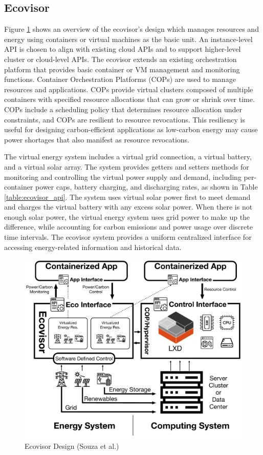 \subsection{Ecovisor}

Figure \ref{fig:ecovisor_design} shows an overview of the ecovisor's design
which manages resources and energy using containers or virtual machines as the
basic unit. An instance-level API is chosen to align with existing cloud APIs
and to support higher-level cluster or cloud-level APIs. The ecovisor extends an
existing orchestration platform that provides basic container or VM management
and monitoring functions. Container Orchestration Platforms (COPs) are used to
manage resources and applications. COPs provide virtual clusters composed of
multiple containers with specified resource allocations that can grow or shrink
over time. COPs include a scheduling policy that determines resource allocation
under constraints, and COPs are resilient to resource revocations. This
resiliency is useful for designing carbon-efficient applications as low-carbon
energy may cause power shortages that also manifest as resource revocations.

The virtual energy system includes a virtual grid connection, a virtual battery,
and a virtual solar array. The system provides getters and setters methods for
monitoring and controlling the virtual power supply and demand, including
per-container power caps, battery charging, and discharging rates, as shown in
Table \ref{table:ecovisor_api}. The system uses virtual solar power first to
meet demand and charges the virtual battery with any excess solar power. When
there is not enough solar power, the virtual energy system uses grid power to
make up the difference, while accounting for carbon emissions and power usage
over discrete time intervals. The ecovisor system provides a uniform centralized
interface for accessing energy-related information and historical data.

\begin{figure}
    \centering
    \includegraphics[width=\linewidth]{figures/ecovisor_design}
    \caption{Ecovisor Design (Souza et al.) \cite{souza2023}}
    \label{fig:ecovisor_design}
\end{figure}

